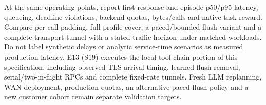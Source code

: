 At the same operating points, report first-response and episode p50/p95 latency, queueing, deadline violations, backend quotas, bytes/calls and native task reward. Compare per-call padding, full-profile cover, a paced/bounded-flush variant and a complete transport tunnel with a stated traffic horizon under matched workloads. Do not label synthetic delays or analytic service-time scenarios as measured production latency. E13 (S19) executes the local tool-chain portion of this specification, including observed TLS arrival timing, learned flush removal, serial/two-in-flight RPCs and complete fixed-rate tunnels. Fresh LLM replanning, WAN deployment, production quotas, an alternative paced-flush policy and a new customer cohort remain separate validation targets.
